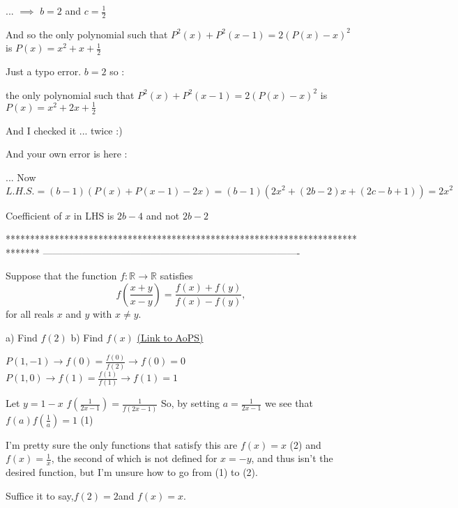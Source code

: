 \begin{solution}
	\begin{tcolorbox} ... $ \implies$ $ b = 2$ and $ c = \frac {1}{2}$

And so the only polynomial such that $ P^2(x) + P^2(x - 1) = 2(P(x) - x)^2$ is $ \boxed{P(x) = x^2 + x + \frac {1}{2}}$\end{tcolorbox}

Just a typo error. $ b = 2$ so :

the only polynomial such that $ P^2(x) + P^2(x - 1) = 2(P(x) - x)^2$ is $ \boxed{P(x) = x^2 + 2x + \frac {1}{2}}$

And I checked it ... twice :)

And your own error is here :
\begin{tcolorbox} ... Now $ L.H.S. = (b - 1)(P(x) + P(x - 1) - 2x) = (b - 1)(2x^2 + (2b - 2)x + (2c - b + 1)) = 2x^2$ \end{tcolorbox}

Coefficient of $ x$ in LHS is $ 2b-4$ and not $ 2b-2$
\end{solution}
*******************************************************************************
-------------------------------------------------------------------------------

\begin{problem}
	Suppose that the function $ f: \mathbb R \rightarrow \mathbb R$ satisfies \[{ f\left(\frac {x + y}{x - y}\right) = \frac {f(x) + f(y)}{f(x) -f( y)}},\] for all reals $x$ and $y$ with $x\neq y$.

a) Find $ f(2)$
b) Find $ f(x)$
	\flushright \href{https://artofproblemsolving.com/community/c6h276874}{(Link to AoPS)}
\end{problem}



\begin{solution}
	$ P(1, - 1) \rightarrow f(0) = \frac {f(0)}{f(2)} \rightarrow f(0) = 0$
$ P(1,0) \rightarrow f(1) = \frac {f(1)}{f(1)} \rightarrow f(1) = 1$

Let $ y = 1 - x$
$ f(\frac {1}{2x - 1}) = \frac {1}{f(2x - 1)}$
So, by setting $ a = \frac {1}{2x - 1}$ we see that $  f(a)f (\frac {1}{a} ) = 1 $ (1)

I'm pretty sure the only functions that satisfy this are $ f(x) = x$ (2) and $ f(x) = \frac {1}{x}$, the second of which is not defined for $ x = - y$, and thus isn't the desired function, but I'm unsure how to go from (1) to (2).

Suffice it to say,$ f(2) = 2$and $ f(x) = x$.
\end{solution}



